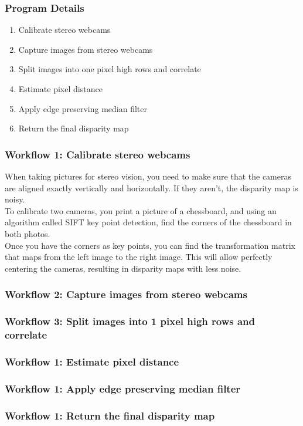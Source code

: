 \documentclass[19pt]{beamer}
\begin{document}
\begin{frame}
\frametitle{Program Details}
\begin{enumerate}
    \item Calibrate stereo webcams\\[15pt]
    \item Capture images from stereo webcams\\[15pt]
    \item Split images into one pixel high rows and correlate\\[15pt]
    \item Estimate pixel distance\\[15pt]
    \item Apply edge preserving median filter\\[15pt]
    \item Return the final disparity map 
\end{enumerate}
\end{frame}

\begin{frame}
\frametitle{Workflow 1: Calibrate stereo webcams}

When taking pictures for stereo vision, you need to make sure that the cameras are aligned exactly vertically and horizontally. If they aren't, the disparity map is noisy.\\[15pt]
%
To calibrate two cameras, you print a picture of a chessboard, and using an algorithm called SIFT key point detection, find the corners of the chessboard in both photos.\\[15pt]
%
Once you have the corners as key points, you can find the transformation matrix that maps from the left image to the right image. This will allow perfectly centering the cameras, resulting in  disparity maps with less noise.
\end{frame}

\begin{frame}
\frametitle{Workflow 2: Capture images from stereo webcams}
\end{frame}

\begin{frame}
\frametitle{Workflow 3: Split images into 1 pixel high rows and correlate}
\end{frame}

\begin{frame}
\frametitle{Workflow 1: Estimate pixel distance}
\end{frame}

\begin{frame}
\frametitle{Workflow 1: Apply edge preserving median filter}
\end{frame}

\begin{frame}
\frametitle{Workflow 1: Return the final disparity map}
\end{frame}
\end{document}
